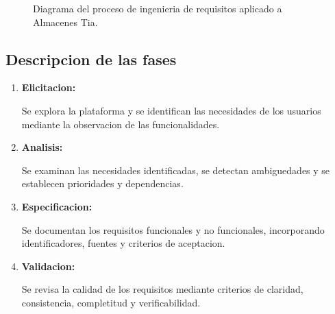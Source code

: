 \documentclass[11pt,a4paper]{article}
\begin{document}
\begin{figure}[H]

\shorthandon{>}

\caption{Diagrama del proceso de ingenieria de
requisitos aplicado a Almacenes Tia.}
\label{fig:proceso-requisitos}
\end{figure}

\subsection{Descripcion de las fases}

\begin{enumerate}

    \item \textbf{Elicitacion:}

    Se explora la plataforma y se identifican
    las necesidades de los usuarios mediante
    la observacion de las funcionalidades.

    \item \textbf{Analisis:}

    Se examinan las necesidades identificadas,
    se detectan ambiguedades y se establecen
    prioridades y dependencias.

    \item \textbf{Especificacion:}

    Se documentan los requisitos funcionales
    y no funcionales, incorporando identificadores,
    fuentes y criterios de aceptacion.

    \item \textbf{Validacion:}

    Se revisa la calidad de los requisitos mediante
    criterios de claridad, consistencia,
    completitud y verificabilidad.

\end{enumerate}
\end{document}
